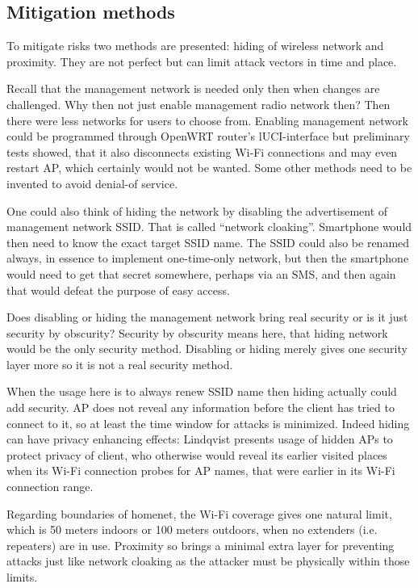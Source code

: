 \documentclass[12pt,a4paper,english]{tutthesis}
\begin{document}
\subsection{Mitigation methods}
\label{sec-6-5-4}
To mitigate risks two methods are presented: hiding of
wireless network and proximity. They are not perfect but can
limit attack vectors in time and place.


Recall that the management network is needed only then when changes
are challenged. Why then not just enable management radio network
then? Then there were less networks for users to choose from.
Enabling management network could be programmed through OpenWRT router's 
lUCI-interface but preliminary tests showed, that it also 
disconnects existing Wi-Fi connections and may even restart AP,
which certainly would not be wanted. Some other methods need to
be invented to avoid denial-of service.

\label{tag:hidessid}
One could also think of hiding the network by disabling the
advertisement of management network SSID. That is called ``network
cloaking''.  Smartphone would then need to know the exact target SSID name.
The SSID could also be renamed always, in essence
to implement one-time-only network, but then the smartphone would
need to get that secret somewhere, perhaps via an SMS, and then again
that would defeat the purpose of easy access.

Does disabling or hiding the management network bring real security or
is it just security by obscurity?  Security by obscurity means here,
that hiding network would be the only security method.
Disabling or hiding  merely gives one security layer more so it is not
a real security method.

When the usage here is to always renew SSID name then
hiding actually could add security. AP does not reveal any information
before the client has tried to connect to it, so at least 
the time window for attacks is minimized. Indeed hiding can have
privacy enhancing effects: Lindqvist \cite{hidden-wlan} presents usage
of hidden APs to protect privacy of client, who otherwise would
reveal its earlier visited places when its Wi-Fi connection probes for
AP names, that were earlier in its Wi-Fi connection range.


Regarding boundaries of homenet, the Wi-Fi coverage gives 
one natural limit, which is 50 meters indoors or 100 meters outdoors,
when no extenders (i.e. repeaters) are in use.
Proximity so brings a minimal extra layer for preventing attacks
just like network cloaking as the attacker must be physically within those limits.
\end{document}
